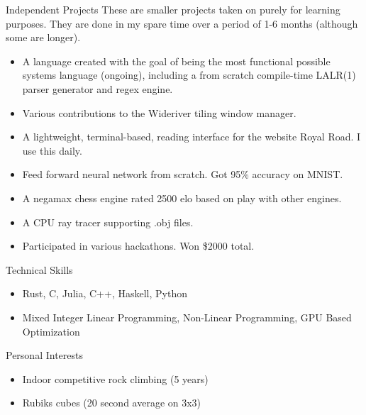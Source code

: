\documentclass[10pt]{resume}
\newenvironment{rlist}{
  \begin{itemize}{\leftmargin=0em}
  \itemsep -0.5em \vspace{-0.5em}
  }{\end{itemize}}
\begin{document}
\begin{rSection}{Independent Projects}
    These are smaller projects taken on purely for learning purposes. They are
    done in my spare time over a period of 1-6 months (although some are
    longer).
    \begin{rlist}
        \item A language created with the goal of being the most functional
            possible systems language (ongoing), including a from scratch
            compile-time LALR(1) parser generator and regex engine.
        \item Various contributions to the Wideriver tiling window manager.
        \item A lightweight, terminal-based, reading interface for the website
            Royal Road. I use this daily.
        \item Feed forward neural network from scratch. Got 95\% accuracy on
            MNIST.
        \item A negamax chess engine rated 2500 elo based on play with other
            engines.
        \item A CPU ray tracer supporting .obj files.
        \item Participated in various hackathons. Won \$2000 total.
    \end{rlist}
\end{rSection}

\begin{rSection}{Technical Skills}
    \begin{itemize}[leftmargin=*]
        \item Rust, C, Julia, C++, Haskell, Python
        \item Mixed Integer Linear Programming, Non-Linear Programming, GPU
            Based Optimization
    \end{itemize}
\end{rSection}

\begin{rSection}{Personal Interests}
    \begin{rlist}
    \item Indoor competitive rock climbing (5 years)
    \item Rubiks cubes (20 second average on 3x3)
    \end{rlist}
\end{rSection}
\end{document}

